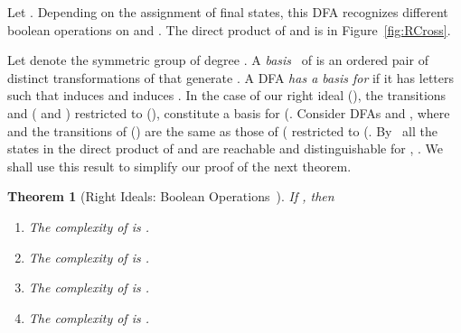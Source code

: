 \documentclass[final]{dmtcs-episciences}
\newcommand{\be}{\begin{enumerate}}
\newcommand{\ee}{\end{enumerate}}
\newtheorem{theorem}{Theorem}
\theoremstyle{definition}
\theoremstyle{remark}
\begin{document}
Let .
Depending on the assignment of final states, this DFA recognizes different boolean operations on  and .
The 
direct product  of  and   is  in
Figure~\ref{fig:RCross}.  





Let  denote the symmetric group of degree . 
A \emph{basis}~\cite{Pic39} of 
is an ordered pair  of distinct transformations of  that generate .
A DFA \emph{has a basis  for } if it has letters  such that  induces  and  induces .
In the case of our right ideal  (), the transitions  and  ( and ) restricted to (), constitute a basis for  (. 
Consider DFAs 
 and 
, where  and the transitions of  () are the same as those of  ( restricted to  (.
By~\cite[Theorem 1]{BBMR14} all the states in the direct product of 
  and  are reachable and distinguishable for 
,  .
We shall use this result to simplify our proof of the next theorem.

\begin{theorem}[Right Ideals: Boolean Operations~\cite{BrDa14}]
\label{thm:RBool}
If , then
\be
\item
The complexity of  is .
\item
The complexity of  is .
\item
The complexity of  is .
\item
The complexity of  is .
\ee
\end{theorem}
\end{document}
